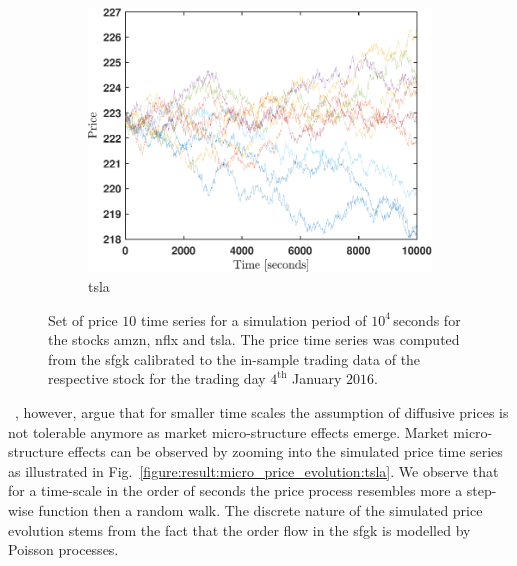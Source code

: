 \documentclass[11pt, a4paper]{thesis}  %
\begin{document}
\begin{figure}[H]
	\begin{subfigure}[b]{0.5\textwidth}
    	\includegraphics[width=\textwidth]{./SignaturePlot/TSLA/20160104/simulated_paths.pdf}
		\caption{\ac{tsla}}
        \label{figure:result:price_evolution:tsla}
	\end{subfigure}	

	\caption{Set of price $10$ time series for a simulation period of $10^4\,$seconds for 
	the stocks \ac{amzn}, \ac{nflx} and \ac{tsla}. The price time series was computed from 
	the \ac{sfgk} calibrated to the in-sample trading data of the respective stock for the 
	trading day $4^\textrm{th}$ January $2016$.}
	 \label{figure:result:price_evolution}
\end{figure}


\noindent \citeauthor{Anderson:2000:GreatRealisations}~\citep{Anderson:2000:GreatRealisations}, however, argue that for smaller time scales the assumption of diffusive prices is not tolerable anymore as market micro-structure effects emerge. Market micro-structure effects can be observed by zooming into the simulated price time series as illustrated in Fig.~\ref{figure:result:micro_price_evolution:tsla}. We observe
that for a time-scale in the order of seconds the price process resembles more a step-wise
function then a random walk. The discrete nature of the simulated price evolution stems from the
fact that the order flow in the \ac{sfgk} is modelled by Poisson processes.
\end{document}
